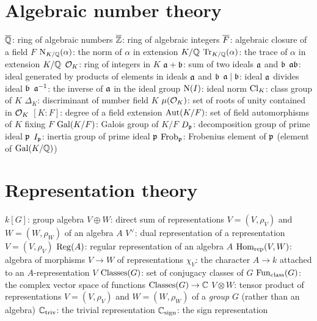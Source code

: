 \section{Algebraic number theory}
\begin{itemize}
	\ii $\ol \QQ$: ring of algebraic numbers
	\ii $\ol \ZZ$: ring of algebraic integers
	\ii $\ol F$: algebraic closure of a field $F$
	\ii $\NK(\alpha)$: the norm of $\alpha$ in extension $K/\QQ$
	\ii $\TrK(\alpha)$: the trace of $\alpha$ in extension $K/\QQ$
	\ii $\OO_K$: ring of integers in $K$
	\ii $\aa+\bb$: sum of two ideals $\aa$ and $\bb$
	\ii $\aa\bb$: ideal generated by products of elements in ideals $\aa$ and $\bb$
	\ii $\aa \mid \bb$: ideal $\aa$ divides ideal $\bb$
	\ii $\aa\inv$: the inverse of $\aa$ in the ideal group
	\ii $\Norm(I)$: ideal norm
	\ii $\Cl_K$: class group of $K$
	\ii $\Delta_K$: discriminant of number field $K$
	\ii $\mu(\OO_K)$: set of roots of unity contained in $\OO_K$
	\ii $[K:F]$: degree of a field extension
	\ii $\Aut(K/F)$: set of field automorphisms of $K$ fixing $F$
	\ii $\Gal(K/F)$: Galois group of $K/F$
	\ii $D_\pp$: decomposition group of prime ideal $\pp$
	\ii $I_\pp$: inertia group of prime ideal $\pp$
	\ii $\Frob_\pp$: Frobenius element of $\pp$ (element of $\Gal(K/\QQ)$)
\end{itemize}

\section{Representation theory}
\begin{itemize}
	\ii $k[G]$: group algebra
	\ii $V \oplus W$: direct sum of representations $V = (V, \rho_V)$
	and $W = (W, \rho_W)$ of an algebra $A$
	\ii $V^\vee$: dual representation of a representation $V = (V, \rho_V)$
	\ii $\Reg(A)$: regular representation of an algebra $A$
	\ii $\Homrep(V,W)$: algebra of morphisms $V \to W$ of representations
	\ii $\chi_V$: the character $A \to k$ attached to an $A$-representation $V$
	\ii $\Classes(G)$: set of conjugacy classes of $G$
	\ii $\FunCl(G)$: the complex vector space of functions $\Classes(G) \to \CC$
	\ii $V \otimes W$: tensor product of representations $V = (V, \rho_V)$ and $W = (W, \rho_W)$
	of a \emph{group} $G$ (rather than an algebra)
	\ii $\Ctriv$: the trivial representation
	\ii $\Csign$: the sign representation
\end{itemize}

